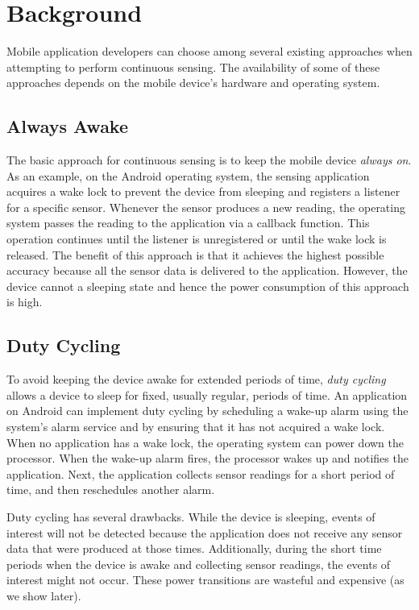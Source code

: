 
\section{Background}
\label{sec:background}

Mobile application developers can choose among several existing approaches when
attempting to perform continuous sensing. The availability of some of these
approaches depends on the mobile device's hardware and operating system.

\subsection{Always Awake}

The basic approach for continuous sensing is to keep the mobile device
\emph{always on}. As an example, on the Android operating system, the sensing
application acquires a wake lock to prevent the device from sleeping and
registers a listener for a specific sensor. Whenever the sensor produces a new
reading, the operating system passes the reading to the application via a
callback function. This operation continues until the listener is unregistered
or until the wake lock is released. The benefit of this approach is that it
achieves the highest possible accuracy because all the sensor data is delivered to the
application. However, the device cannot a sleeping state and hence the power
consumption of this approach is high.

\subsection{Duty Cycling}

To avoid keeping the device awake for extended periods of time, \emph{duty 
cycling} allows a device to sleep for fixed, usually regular, periods of
time. An application on Android can implement duty cycling by scheduling a wake-up 
alarm using the system's alarm service and by ensuring that it has not
acquired a wake lock. When no application has a wake lock, the operating system
can power down the processor. When the wake-up alarm fires, the processor wakes 
up and notifies the application. Next, the application collects sensor readings
for a short period of time, and then reschedules another alarm.

Duty cycling has several drawbacks. While the device is sleeping, events of interest will not be 
detected because the application does not receive any sensor data that were produced at those 
times. Additionally, during the short time periods when the device is awake and collecting 
sensor readings, the events of interest might not occur. These power transitions are wasteful 
and expensive (as we show later). 

